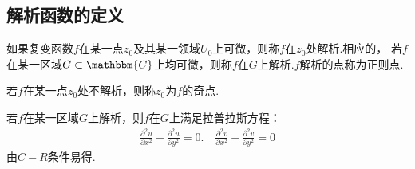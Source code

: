     \subsection{解析函数的定义}
        \begin{definition}[解析函数]\label{def:analytic_function}
            如果复变函数$f$在某一点$z_0$及其某一领域$U_0$上可微，则称$f$在$z_0$处解析.相应的，
            若$f$在某一区域$G \subset \mathbbm{C}$上均可微，则称$f$在$G$上解析.$f$解析的点称为正则点.
        \end{definition}
        \begin{definition}[奇点]\label{def:singular_point}
            若$f$在某一点$z_0$处不解析，则称$z_0$为$f$的奇点.
        \end{definition}
        \begin{theorem}[Laplace 方程]\label{thm:Laplace_equation}
            若$f$在某一区域$G$上解析，则$f$在$G$上满足拉普拉斯方程：
            \begin{align*}
                \frac{\partial^2 u}{\partial x^2} + \frac{\partial^2 u}{\partial y^2} = 0. \quad \frac{\partial^2 v}{\partial x^2} + \frac{\partial^2 v}{\partial y^2} = 0
            \end{align*}
            由$C-R$条件易得.
        \end{theorem}

